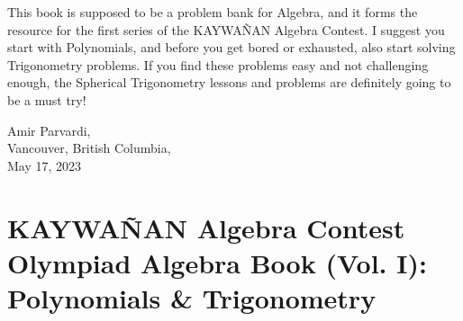 \documentclass[12pt,a4paper]{memoir}
\theoremstyle{definition}
\begin{document}
\vspace{0.5em}

This book is supposed to be a problem bank for Algebra, and it forms the resource for the first series of the KAYWAÑAN Algebra Contest. I suggest you start with Polynomials, and before you get bored or exhausted, also start solving Trigonometry problems. If you find these problems easy and not challenging enough, the Spherical Trigonometry lessons and problems are definitely going to be a must try!

\begin{flushright}
	Amir Parvardi,\\
	Vancouver, British Columbia,\\
	May 17, 2023
\end{flushright}

\tableofcontents\label{TOC}
\listoffigures

\mainmatter

\pagestyle{fancy}
\fancyhf{}








\part{KAYWAÑAN Algebra Contest\\ Olympiad Algebra Book (Vol. I): \\ Polynomials \& Trigonometry}\label{part:VolI}
\end{document}
